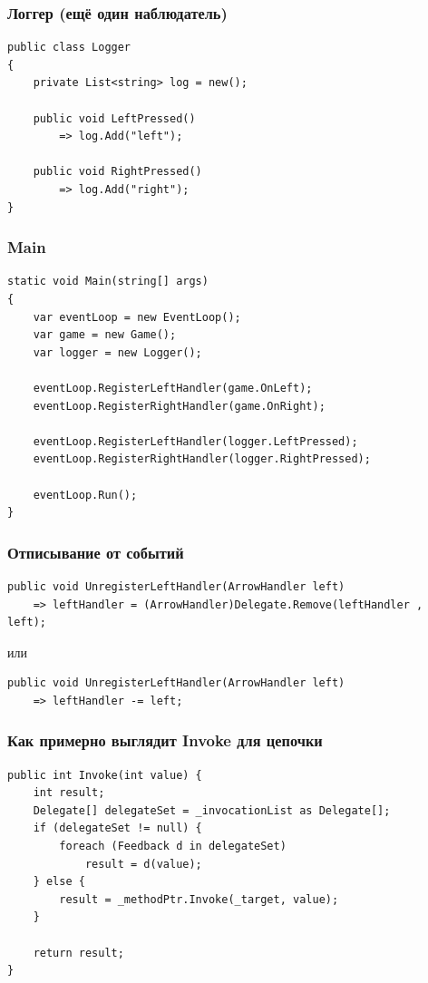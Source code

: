 \documentclass{../../slides-style}
\begin{document}
    \begin{frame}[fragile]
        \frametitle{Логгер (ещё один наблюдатель)}
        \begin{verbatim}
public class Logger
{
    private List<string> log = new();

    public void LeftPressed()
        => log.Add("left");

    public void RightPressed()
        => log.Add("right");
}
        \end{verbatim}
    \end{frame}

    \begin{frame}[fragile]
        \frametitle{Main}
        \begin{verbatim}
static void Main(string[] args)
{
    var eventLoop = new EventLoop();
    var game = new Game();
    var logger = new Logger();

    eventLoop.RegisterLeftHandler(game.OnLeft);
    eventLoop.RegisterRightHandler(game.OnRight);

    eventLoop.RegisterLeftHandler(logger.LeftPressed);
    eventLoop.RegisterRightHandler(logger.RightPressed);

    eventLoop.Run();
}
        \end{verbatim}
    \end{frame}

    \begin{frame}[fragile]
        \frametitle{Отписывание от событий}
        \begin{verbatim}
public void UnregisterLeftHandler(ArrowHandler left)
    => leftHandler = (ArrowHandler)Delegate.Remove(leftHandler , left);
        \end{verbatim}
        \vspace{3mm}
        или
        \begin{verbatim}
public void UnregisterLeftHandler(ArrowHandler left)
    => leftHandler -= left;
        \end{verbatim}
    \end{frame}

    \begin{frame}[fragile]
        \frametitle{Как примерно выглядит Invoke для цепочки}
        \begin{verbatim}
public int Invoke(int value) {
    int result;
    Delegate[] delegateSet = _invocationList as Delegate[];
    if (delegateSet != null) {
        foreach (Feedback d in delegateSet)
            result = d(value);
    } else {
        result = _methodPtr.Invoke(_target, value);
    }

    return result;
}
        \end{verbatim}
    \end{frame}
\end{document}
